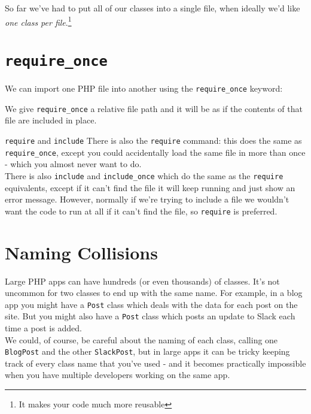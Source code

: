So far we've had to put all of our classes into a single file, when ideally we'd like \textit{one class per file}.\footnote{It makes your code much more reusable}

\section{\texttt{require\_once}}

We can import one PHP file into another using the \texttt{require\_once} keyword:


We give \texttt{require\_once} a relative file path and it will be as if the contents of that file are included in place.

\pagebreak

\begin{infobox}{\texttt{require} and \texttt{include}}
    There is also the \texttt{require} command: this does the same as \texttt{require\_once}, except you could accidentally load the same file in more than once - which you almost never want to do.
    \\

    There is also \texttt{include} and \texttt{include\_once} which do the same as the \texttt{require} equivalents, except if it can't find the file it will keep running and just show an error message. However, normally if we're trying to include a file we wouldn't want the code to run at all if it can't find the file, so \texttt{require} is preferred.
\end{infobox}



\section{Naming Collisions}

Large PHP apps can have hundreds (or even thousands) of classes. It's not uncommon for two classes to end up with the same name. For example, in a blog app you might have a \texttt{Post} class which deals with the data for each post on the site. But you might also have a \texttt{Post} class which posts an update to Slack each time a post is added.
\\

We could, of course, be careful about the naming of each class, calling one \texttt{BlogPost} and the other \texttt{SlackPost}, but in large apps it can be tricky keeping track of every class name that you've used - and it becomes practically impossible when you have multiple developers working on the same app.
\\

